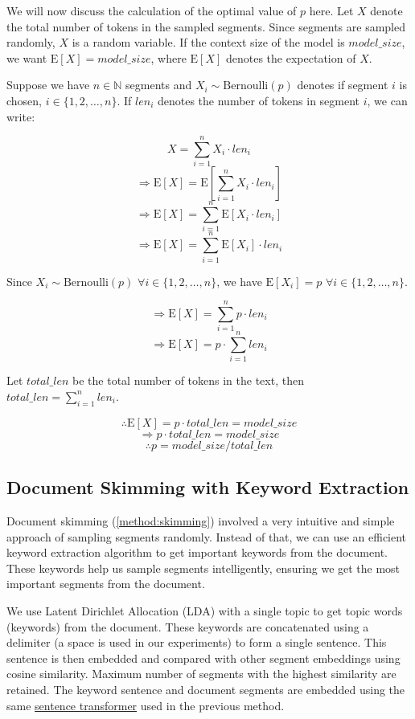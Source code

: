 We will now discuss the calculation of the optimal value of $p$ here.
Let $X$ denote the total number of tokens in the sampled segments.
Since segments are sampled randomly, $X$ is a random variable.
If the context size of the model is $model\_size$, we want $\mathrm{E}[X] = model\_size$,
where $\mathrm{E}[X]$ denotes the expectation of $X$.

Suppose we have $n \in \mathbb{N}$ segments and $X_i \sim \mathrm{Bernoulli}(p)$ denotes
if segment $i$ is chosen, $i \in \{1, 2, \dots, n\}$.
If $len_i$ denotes the number of tokens in segment $i$, we can write:

\[ X = \sum_{i = 1}^{n} X_i \cdot len_i \]
\[ \Rightarrow \mathrm{E}[X] = \mathrm{E}[\sum_{i = 1}^{n} X_i \cdot len_i] \]
\[ \Rightarrow \mathrm{E}[X] = \sum_{i = 1}^{n} \mathrm{E}[X_i \cdot len_i] \]
\[ \Rightarrow \mathrm{E}[X] = \sum_{i = 1}^{n} \mathrm{E}[X_i] \cdot len_i \]

Since $X_i \sim \mathrm{Bernoulli}(p)$ $\forall i \in \{1, 2, \dots, n\}$, we
have $\mathrm{E}[X_i] = p$ $\forall i \in \{1, 2, \dots, n\}$.

\[ \Rightarrow \mathrm{E}[X] = \sum_{i = 1}^{n} p \cdot len_i \]
\[ \Rightarrow \mathrm{E}[X] = p \cdot \sum_{i = 1}^{n} len_i \]

Let $total\_len$ be the total number of tokens in the text, then
$total\_len = \sum_{i = 1}^{n} len_i$.

\[ \therefore \mathrm{E}[X] = p \cdot total\_len = model\_size \]
\[ \Rightarrow p \cdot total\_len = model\_size \]
\[ \therefore p = model\_size / total\_len \]


\subsection{Document Skimming with Keyword Extraction}
\label{method:skimming-keyword}

Document skimming (\ref{method:skimming}) involved a very intuitive and simple
approach of sampling segments randomly.
Instead of that, we can use an efficient keyword extraction algorithm to get important keywords
from the document.
These keywords help us sample segments intelligently, ensuring we get the most important
segments from the document.

We use Latent Dirichlet Allocation (LDA) \cite{blei2003latent} with a single topic to get topic
words (keywords) from the document.
These keywords are concatenated using a delimiter (a space is used in our experiments) to form a
single sentence.
This sentence is then embedded and compared with other segment embeddings using cosine similarity.
Maximum number of segments with the highest similarity are retained.
The keyword sentence and document segments are embedded using the same
\href{https://huggingface.co/sentence-transformers/all-MiniLM-L6-v2}{sentence transformer}
used in the previous method.

